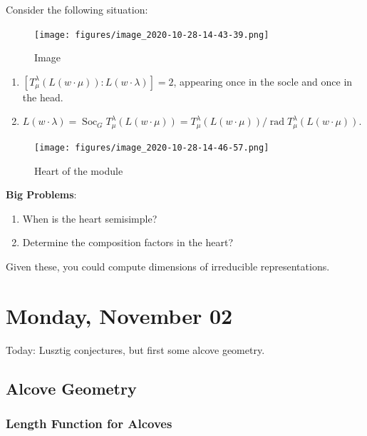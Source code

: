 \begin{proposition}[?]

Consider the following situation:

\begin{figure}
\centering
\texttt{[image: figures/image\_2020-10-28-14-43-39.png]}
\caption{Image}
\end{figure}

\begin{enumerate}
\def\labelenumi{\arabic{enumi}.}
\item
  \([T_\mu^\lambda (L(w\cdot \mu)) : L(w\cdot \lambda)] = 2\), appearing
  once in the socle and once in the head.
\item
  \(L(w\cdot \lambda) = \operatorname{Soc}_G T_\mu^\lambda(L(w\cdot \mu)) = T_\mu^\lambda(L(w\cdot \mu)) / {\operatorname{rad}}T_\mu^\lambda (L(w\cdot \mu))\).
\end{enumerate}

\begin{figure}
\centering
\texttt{[image: figures/image\_2020-10-28-14-46-57.png]}
\caption{Heart of the module}
\end{figure}

\end{proposition}

\textbf{Big Problems}:

\begin{enumerate}
\def\labelenumi{\arabic{enumi}.}
\item
  When is the heart semisimple?
\item
  Determine the composition factors in the heart?
\end{enumerate}

Given these, you could compute dimensions of irreducible
representations.

\hypertarget{monday-november-02}{%
\section{Monday, November 02}\label{monday-november-02}}

Today: Lusztig conjectures, but first some alcove geometry.

\hypertarget{alcove-geometry}{%
\subsection{Alcove Geometry}\label{alcove-geometry}}

\hypertarget{length-function-for-alcoves}{%
\subsubsection{Length Function for
Alcoves}\label{length-function-for-alcoves}}


